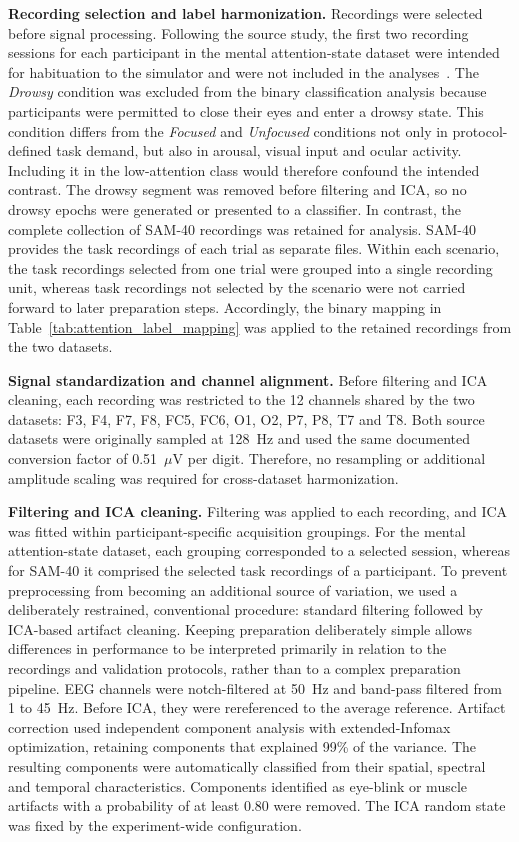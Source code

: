 \documentclass[10pt,letterpaper]{article}
\newcommand{\rev}[1]{#1}
\begin{document}
\rev{\textbf{Recording selection and label harmonization.} Recordings were selected
before signal processing. Following the source study, the first two recording
sessions for each participant in the mental attention-state dataset were
intended for habituation to the simulator and were not included in the
analyses~\cite{aci2019attention}. The \textit{Drowsy} condition was excluded
from the binary classification analysis because participants were
permitted to close their eyes and enter a drowsy state. This condition differs
from the \textit{Focused} and \textit{Unfocused} conditions not only in
protocol-defined task demand, but also in arousal, visual input and ocular
activity. Including it in the low-attention class would therefore confound the
intended contrast. The drowsy segment was removed before filtering and ICA, so
no drowsy epochs were generated or presented to a classifier. In contrast, the complete collection of SAM-40 recordings was
retained for analysis. SAM-40 provides the task recordings of each trial as
separate files. Within each scenario, the task recordings selected from one
trial were grouped into a single recording unit, whereas task recordings not
selected by the scenario were not carried forward to later preparation steps.
Accordingly, the binary mapping in Table~\ref{tab:attention_label_mapping} was applied to the
retained recordings from the two datasets.}

\rev{\textbf{Signal standardization and channel alignment.} Before filtering
and ICA cleaning, each recording was restricted to the 12 channels shared by
the two datasets: F3, F4, F7, F8, FC5, FC6, O1, O2, P7, P8, T7 and T8. Both
source datasets were originally sampled at 128~Hz and used the same documented
conversion factor of 0.51~$\mu$V per digit. Therefore, no resampling or
additional amplitude scaling was required for cross-dataset harmonization.}

\rev{\textbf{Filtering and ICA cleaning.} Filtering was applied to each
recording, and ICA was fitted within participant-specific acquisition
groupings. For the mental attention-state dataset, each grouping corresponded
to a selected session, whereas for SAM-40 it comprised the selected task recordings
of a participant. To prevent preprocessing from becoming an additional source
of variation, we used a deliberately restrained, conventional procedure:
standard filtering followed by ICA-based artifact cleaning. Keeping
preparation deliberately simple allows differences in performance to be
interpreted primarily in relation to the recordings and validation protocols,
rather than to a complex preparation pipeline. EEG channels were notch-filtered
at 50~Hz and band-pass filtered from 1 to 45~Hz. Before
ICA, they were rereferenced to the average reference. Artifact correction used independent component analysis with
extended-Infomax optimization, retaining components that explained 99\% of the
variance. The resulting components were automatically classified from their
spatial, spectral and temporal characteristics. Components identified as
eye-blink or muscle artifacts with a probability of at least 0.80 were removed.
The ICA random state was fixed by the experiment-wide configuration.}
\end{document}

